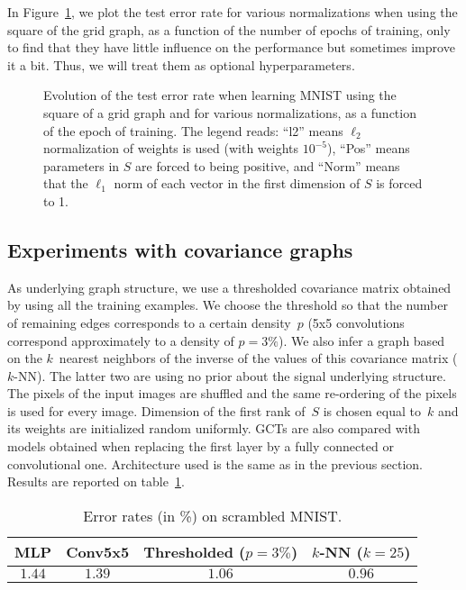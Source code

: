 In Figure~\ref{functionofepoch}, we plot the test error rate for various normalizations when using the square of the grid graph, as a function of the number of epochs of training, only to find that they have little influence on the performance but sometimes improve it a bit. Thus, we will treat them as optional hyperparameters.

\begin{figure}[H]
  \begin{center}
    
  \end{center}
  \caption{Evolution of the test error rate when learning MNIST using the square of a grid graph and for various normalizations, as a function of the epoch of training. The legend reads: ``l2'' means $\ell_2$ normalization of weights is used (with weights $10^{-5}$), ``Pos'' means parameters in $S$ are forced to being positive, and ``Norm'' means that the $\ell_1$ norm of each vector in the first dimension of $S$ is forced to 1.}
  \label{functionofepoch}
\end{figure}

\subsection{Experiments with covariance graphs}

As underlying graph structure, we use a thresholded covariance matrix obtained by using all the training examples. We choose the threshold so that the number of remaining edges corresponds to a certain density~$p$ (5x5 convolutions correspond approximately to a density of $p=3\%$). We also infer a graph based on the $k$~nearest neighbors of the inverse of the values of this covariance matrix ($k$-NN). The latter two are using no prior about the signal underlying structure. The pixels of the input images are shuffled and the same re-ordering of the pixels is used for every image. Dimension of the first rank of~$S$ is chosen equal to~$k$ and its weights are initialized random uniformly.
GCTs are also compared with models obtained when replacing the first layer by a fully connected or convolutional one. Architecture used is the same as in the previous section. Results are reported on table~\ref{covar}.

\begin{table}[H]
  \caption{Error rates (in \%) on scrambled MNIST.}
  \begin{center}
    \bgroup
    \def\arraystretch{1.5}%
    \begin{tabular}{|c|c|c|c|}
      \hline
      MLP & Conv5x5 & Thresholded ($p=3\%$) & $k$-NN ($k=25$)\\
      \hline
      $1.44$ & $1.39$ & $1.06$ & $0.96$\\
      \hline
    \end{tabular}
    \egroup
  \end{center}
  \label{covar}
  \end{table}

